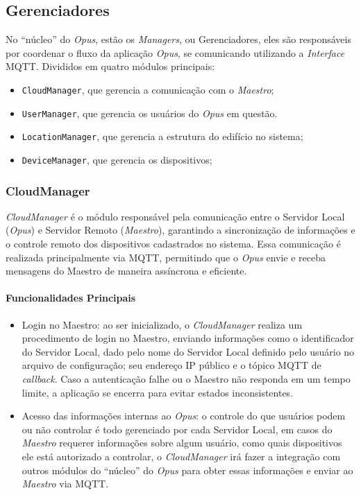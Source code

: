 \subsection{\textbf{Gerenciadores}}

No ``núcleo'' do \emph{Opus}, estão os \emph{Managers}, ou Gerenciadores, eles são responsáveis por coordenar o fluxo
da aplicação \emph{Opus}, se comunicando utilizando a \emph{Interface} MQTT. Divididos em quatro módulos principais:
\begin{itemize}
    \item \lstinline{CloudManager}, que gerencia a comunicação com o \emph{Maestro};
    \item \lstinline{UserManager}, que gerencia os usuários do \emph{Opus} em questão.
    \item \lstinline{LocationManager}, que gerencia a estrutura do edifício no sistema;
    \item \lstinline{DeviceManager}, que gerencia os dispositivos;
\end{itemize}

\subsubsection{CloudManager}
\emph{CloudManager} é o módulo responsável pela comunicação entre o Servidor Local (\emph{Opus}) e Servidor Remoto (\emph{Maestro}), 
garantindo a sincronização de informações e o controle remoto dos dispositivos cadastrados no sistema. 
Essa comunicação é realizada principalmente via MQTT, permitindo que o \emph{Opus} envie e receba mensagens do Maestro de 
maneira assíncrona e eficiente. 

\paragraph{Funcionalidades Principais}
\begin{itemize}
    \item Login no Maestro: ao ser inicializado, o \emph{CloudManager} realiza um procedimento de login no Maestro, enviando informações como o 
        identificador do Servidor Local, dado pelo nome do Servidor Local definido pelo usuário no arquivo de configuração; seu endereço IP público
        e o tópico MQTT de \emph{callback}. Caso a autenticação falhe ou o Maestro não responda em um tempo limite, 
        a aplicação se encerra para evitar estados inconsistentes.
    \item Acesso das informações internas ao \emph{Opus}: o controle do que usuários podem ou não controlar é todo gerenciado por cada Servidor Local,
        em casos do \emph{Maestro} requerer informações sobre algum usuário, como quais dispositivos ele está autorizado a controlar, o \emph{CloudManager}
        irá fazer a integração com outros módulos do ``núcleo'' do \emph{Opus} para obter essas informações e enviar ao \emph{Maestro} via MQTT.
\end{itemize}


